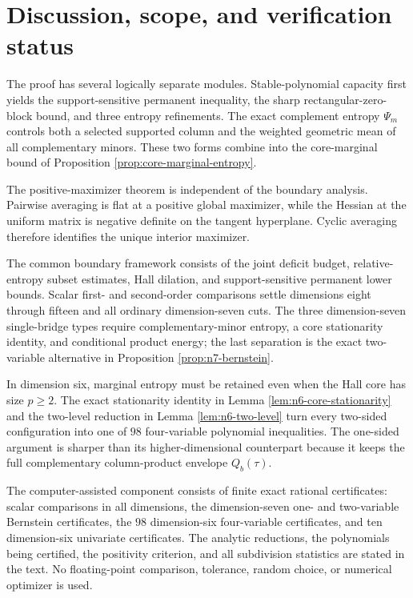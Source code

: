 \documentclass[11pt,a4paper]{article}
\numberwithin{equation}{section}
\theoremstyle{definition}
\newcommand{\1}{\mathbf{1}}
\begin{document}
\section{Discussion, scope, and verification status}\label{sec:discussion}

The proof has several logically separate modules.  Stable-polynomial
capacity first yields the support-sensitive permanent inequality, the sharp
rectangular-zero-block bound, and three entropy refinements.  The exact
complement entropy $\Psi_m$ controls both a selected supported column and the
weighted geometric mean of all complementary minors.  These two forms
combine into the core-marginal bound of Proposition
\ref{prop:core-marginal-entropy}.

The positive-maximizer theorem is independent of the boundary analysis.
Pairwise averaging is flat at a positive global maximizer, while the Hessian
at the uniform matrix is negative definite on the tangent hyperplane.
Cyclic averaging therefore identifies the unique interior maximizer.

The common boundary framework consists of the joint deficit budget,
relative-entropy subset estimates, Hall dilation, and support-sensitive
permanent lower bounds.  Scalar first- and second-order comparisons settle
dimensions eight through fifteen and all ordinary dimension-seven cuts.  The
three dimension-seven single-bridge types require complementary-minor
entropy, a core stationarity identity, and conditional product energy; the
last separation is the exact two-variable alternative in Proposition
\ref{prop:n7-bernstein}.

In dimension six, marginal entropy must be retained even when the Hall core
has size $p\ge2$.  The exact stationarity identity in Lemma
\ref{lem:n6-core-stationarity} and the two-level reduction in Lemma
\ref{lem:n6-two-level} turn every two-sided configuration into one of $98$
four-variable polynomial inequalities.  The one-sided argument is sharper
than its higher-dimensional counterpart because it keeps the full
complementary column-product envelope $Q_b(\tau)$.

The computer-assisted component consists of finite exact rational
certificates: scalar comparisons in all dimensions, the dimension-seven
one- and two-variable Bernstein certificates, the $98$ dimension-six
four-variable certificates, and ten dimension-six univariate certificates.
The analytic reductions, the polynomials being certified, the positivity
criterion, and all subdivision statistics are stated in the text.  No
floating-point comparison, tolerance, random choice, or numerical optimizer
is used.
\end{document}

